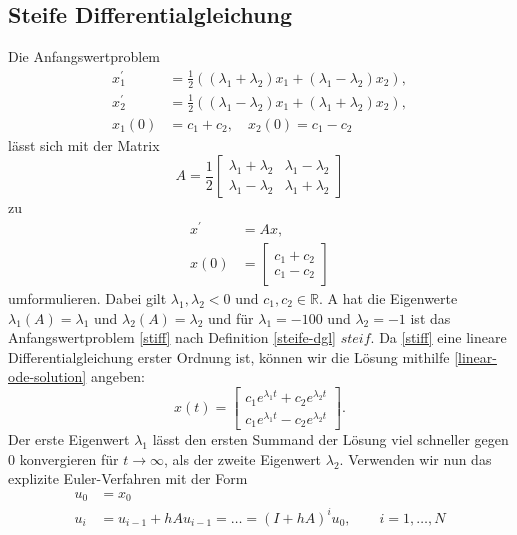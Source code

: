 \subsection{Steife Differentialgleichung}
\label{sec:steife-differentialgleichung}
Die Anfangswertproblem
\begin{align}
       \label{stiff}
       x_{1}^{\prime} &= \frac{1}{2} ((\lambda_1 + \lambda_2)x_1 + (\lambda_1 - \lambda_2)x_2), \nonumber \\
       x_{2}^{\prime} &= \frac{1}{2} ((\lambda_1 - \lambda_2)x_1 + (\lambda_1 + \lambda_2)x_2), \\
       x_1(0) &= c_1 + c_2, \quad x_2(0) = c_1 - c_2 \nonumber
\end{align}
lässt sich mit der Matrix
\[
       A = \frac{1}{2}
       \begin{bmatrix}
                \lambda_1 + \lambda_2 & \lambda_1 - \lambda_2 \\
                \lambda_1 - \lambda_2 & \lambda_1 + \lambda_2
       \end{bmatrix}
\]
zu
\begin{align*}
       x^{\prime} &= Ax, \\
       x(0) &=
       \begin{bmatrix}
              c_1 + c_2 \\
              c_1 - c_2
       \end{bmatrix}
\end{align*}
umformulieren. Dabei gilt $\lambda_1, \lambda_2 < 0$ und $c_1, c_2 \in \mathbb{R}$. A hat die Eigenwerte
$\lambda_1(A) = \lambda_1$ und $\lambda_2(A) = \lambda_2$ und für $\lambda_1 = -100$ und $\lambda_2 = -1$ ist
das Anfangswertproblem \eqref{stiff} nach Definition \eqref{steife-dgl} $steif$. Da \eqref{stiff} eine lineare
Differentialgleichung erster Ordnung ist, können wir die Lösung mithilfe \eqref{linear-ode-solution} angeben:
\[
       x(t) =
       \begin{bmatrix}
              c_1 e^{\lambda_1 t} + c_2 e^{\lambda_2 t} \\
              c_1 e^{\lambda_1 t} - c_2 e^{\lambda_2 t}
       \end{bmatrix}.
\]
Der erste Eigenwert $\lambda_1$ lässt den ersten Summand der Lösung viel schneller gegen $0$ konvergieren für
$t \rightarrow \infty$, als der zweite Eigenwert $\lambda_2$. Verwenden wir nun das explizite Euler-Verfahren mit der
Form
\begin{align*}
       u_0 &= x_0 \\
       u_i &= u_{i-1} + hAu_{i-1}= \dots = (I + hA)^{i}u_0, \qquad i=1,\dots,N
\end{align*}

